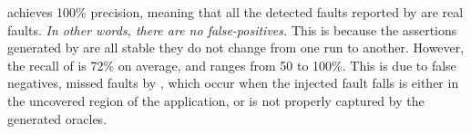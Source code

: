 \tool achieves 100\% precision, meaning that all the detected faults reported by \tool are real faults. {\em In other words, there are no false-positives.}
This is because the assertions generated by \tool are all stable \ie they do not change from one run to another. %
However, the recall of \tool is 72\% on average, and ranges from 50 to 100\%. This is due to false negatives, \ie missed faults by \tool, 
which occur when the injected fault falls is either in the uncovered region of the application, or is not properly captured by the generated oracles.  


